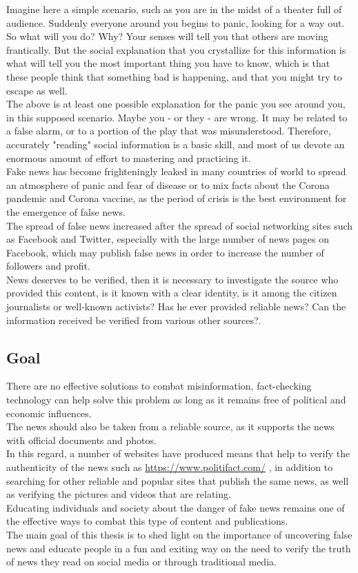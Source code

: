 \documentclass[12pt, letterpaper, twoside]{article}
\begin{document}
Imagine here a simple scenario, such as you are in the midst of a theater full of audience. Suddenly everyone around you begins to panic, looking for a way out. So what will you do? Why? Your senses will tell you that others are moving frantically. But the social explanation that you crystallize for this information is what will tell you the most important thing you have to know, which is that these people think that something bad is happening, and that you might try to escape as well.\\

The above is at least one possible explanation for the panic you see around you, in this supposed scenario. Maybe you - or they - are wrong. It may be related to a false alarm, or to a portion of the play that was misunderstood. Therefore, accurately "reading" social information is a basic skill, and most of us devote an enormous amount of effort to mastering and practicing it.\\
Fake news has become frighteningly leaked in many countries of  world to spread an atmosphere of panic and fear of disease or to mix facts about the Corona pandemic and Corona vaccine, as the period of crisis is the best environment for the emergence of false news.\\
The spread of false news increased after the spread of social networking sites such as Facebook and Twitter, especially with the large number of news pages on Facebook, which may publish false news in order to increase the number of followers and profit.\\
 News deserves to be verified, then it is necessary to investigate the source who provided this content, is it known with a clear identity, is it among the citizen journalists or well-known activists? Has he ever provided reliable news? Can the information received be verified from various other sources?.\\
\subsection{Goal}
There are no effective solutions to combat misinformation, fact-checking technology can help solve this problem as long as it remains free of political and economic influences.\\
The news should also be taken from a reliable source, as it supports the news with official documents and photos.\\
In this regard, a number of websites have produced means that help to verify the authenticity of the news such as \url{https://www.politifact.com/} , in addition to searching for other reliable and popular sites that publish the same news, as well as verifying the pictures and videos that are relating.\\
Educating individuals and society about the danger of fake news remains one of the effective ways to combat this type of content and publications.\\
The main goal of this thesis is to shed light on the importance of uncovering false news and educate people in a fun and exiting way on the need to verify the truth of news they read on social media or through traditional media.\\
\end{document}
